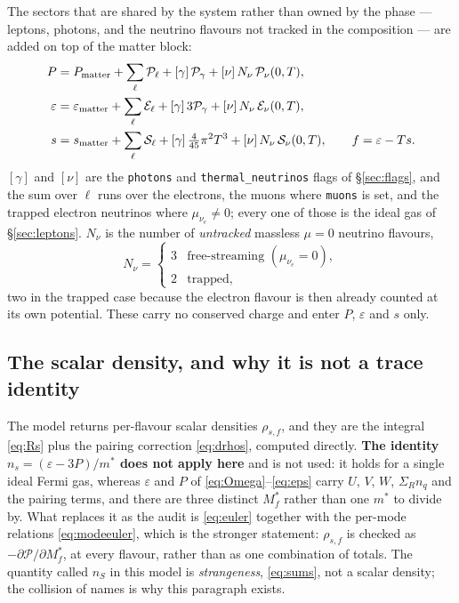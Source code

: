 \documentclass[11pt,a4paper]{article}
\newcommand{\Mstar}{M^{*}}
\newcommand{\code}[1]{\texttt{#1}}
\begin{document}
The sectors that are shared by the system rather than owned by the phase ---
leptons, photons, and the neutrino flavours not tracked in the composition ---
are added on top of the matter block:
\begin{align}
P &= P_{\rm matter} + \sum_\ell \mathcal P_\ell
 + [\gamma]\,\mathcal P_\gamma + [\nu]\,N_\nu\,\mathcal P_{\nu}(0,T),
\label{eq:Ptot}\\
\varepsilon &= \varepsilon_{\rm matter} + \sum_\ell \mathcal E_\ell
 + [\gamma]\,3\mathcal P_\gamma + [\nu]\,N_\nu\,\mathcal E_{\nu}(0,T),
\\
s &= s_{\rm matter} + \sum_\ell \mathcal S_\ell
 + [\gamma]\,\tfrac{4}{45}\pi^2T^3 + [\nu]\,N_\nu\,\mathcal S_{\nu}(0,T),
\qquad f = \varepsilon - Ts .
\label{eq:stot}
\end{align}
$[\gamma]$ and $[\nu]$ are the \code{photons} and \code{thermal\_neutrinos}
flags of \S\ref{sec:flags}, and the sum over $\ell$ runs over the electrons,
the muons where \code{muons} is set, and the trapped electron neutrinos where
$\mu_{\nu_e}\neq0$; every one of those is the ideal gas of
\S\ref{sec:leptons}. $N_\nu$ is the number of \emph{untracked} massless
$\mu=0$ neutrino flavours,
\begin{equation}
N_\nu = \begin{cases} 3 & \text{free-streaming } (\mu_{\nu_e}=0),\\
                      2 & \text{trapped},\end{cases}
\end{equation}
two in the trapped case because the electron flavour is then already counted
at its own potential. These carry no conserved charge and enter $P$,
$\varepsilon$ and $s$ only.

\subsection{The scalar density, and why it is not a trace identity}

The model returns per-flavour scalar densities $\rho_{s,f}$, and they are the
integral \eqref{eq:Rs} plus the pairing correction \eqref{eq:drhos}, computed
directly. \textbf{The identity $n_s = (\varepsilon-3P)/m^{*}$ does not apply
here} and is not used: it holds for a single ideal Fermi gas, whereas
$\varepsilon$ and $P$ of \eqref{eq:Omega}--\eqref{eq:eps} carry $U$, $V$, $W$,
$\Sigma_R n_q$ and the pairing terms, and there are three distinct $\Mstar_f$
rather than one $m^{*}$ to divide by. What replaces it as the audit is
\eqref{eq:euler} together with the per-mode relations \eqref{eq:modeeuler},
which is the stronger statement: $\rho_{s,f}$ is checked as
$-\partial\mathcal P/\partial\Mstar_f$, at every flavour, rather than as one
combination of totals. The quantity called $n_S$ in this model is
\emph{strangeness}, \eqref{eq:sums}, not a scalar density; the collision of
names is why this paragraph exists.
\end{document}
